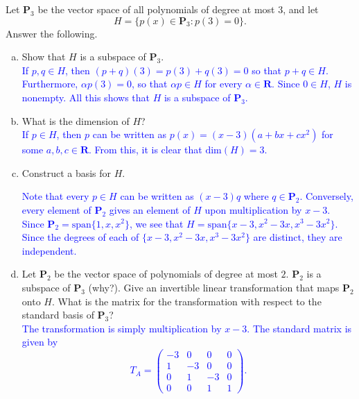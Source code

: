\documentclass[a4paper,11pt]{article}
\newcommand{\R}{\mathbf{R}}
\newcommand{\PP}{\mathbf{P}}
\newcommand{\ddim}{\text{dim}}
\newcommand{\BB}[1]{\textcolor{blue}{#1}}
\begin{document}
 Let $\PP_3$ be the vector space of all polynomials
of degree at most 3, and let
\[
  H = \{p(x) \in \PP_3 : p(3)=0\}.
\]
Answer the following.
\begin{enumerate}[(a)]
\item Show that $H$ is a subspace of $\PP_3$. \\

  \BB{If $p,q \in H$, then $(p+q)(3)=p(3)+q(3)=0$ so that $p+q \in H$.
    Furthermore, $\alpha p(3)=0$, so that $\alpha p \in H$ for every $\alpha \in
    \R$. Since $0 \in H$, $H$ is nonempty. All this shows that $H$ is a subspace
    of $\PP_3$. \\}
  
\item What is the dimension of $H$? \\

  \BB{If $p \in H$, then $p$ can be written as $p(x)=(x-3)(a+bx+cx^2)$ for some
    $a,b,c \in \R$. From this, it is clear that $\ddim(H)=3$. \\}
  
\item Construct a basis for $H$.

  \BB{Note that every $p \in H$ can be written as $(x-3)q$ where $q \in \PP_2$.
    Conversely, every element of $\PP_2$ gives an element of $H$ upon
    multiplication by $x-3$. Since $\PP_2=\text{span}\{1,x,x^2\}$, we see that
    $H=\text{span}\{x-3,x^2-3x,x^3-3x^2\}$. Since the degrees of each of
    $\{x-3,x^2-3x,x^3-3x^2\}$ are distinct, they are independent. \\}

\item Let $\PP_2$ be the vector space of polynomials of degree at most $2$.
  $\PP_2$ is a subspace of $\PP_3$ (why?). Give an invertible linear
  transformation that maps $\PP_2$ onto $H$. What is the matrix for the
  transformation with respect to the standard basis of $\PP_3$? \\

  \BB{The transformation is simply multiplication by $x-3$. The standard matrix
    is given by
    \[
      T_A =
      \left(
        \begin{array}{rrrr}
          -3 & 0 & 0 & 0 \\
          1 & -3 & 0 & 0 \\
          0 & 1 & -3 & 0 \\
          0 & 0 & 1 & 1
        \end{array}
      \right).
    \] \\
  }
\end{enumerate}
\end{document}
